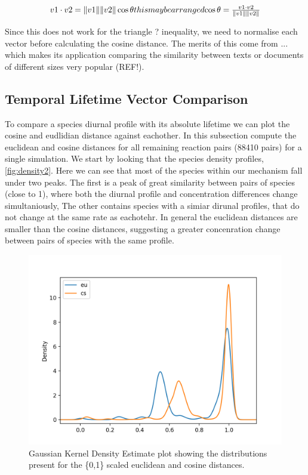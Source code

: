 \begin{equation}
v1 \cdot v2 = \|v1\|\|v2\| \cos \theta
$$this may be arranged$$
\cos \theta = \frac{ v1 \cdot v2}{\|v1\|\|v2\|}
\end{equation}

Since this does not work for the triangle ? inequality, we need to normalise each vector before calculating the cosine distance. The merits of this come from  ... which makes its application comparing the similarity between texts or documents of different sizes very popular (REF!). \\



\subsection{Temporal Lifetime Vector Comparison}

To compare a species diurnal profile with its absolute lifetime we can plot the cosine and eudlidian distance against eachother. In this subsection compute the euclidean and cosine distances for all remaining reaction pairs (88410 pairs) for a single simulation. We start by looking that the species density profiles, \autoref{fig:density2}. Here we can see that most of the species within our mechanism fall under two peaks. The first is a peak of great similarity between pairs of species (close to 1), where both the diurnal profile and concentration differences change simultaniously, The other contains species with a simiar dirunal profiles, that do not change at the same rate as eachotehr. In general the euclidean distances are smaller than the cosine distances, suggesting a greater concenration change between pairs of species with the same profile. 



\begin{figure}
    \centering
\includegraphics[width=.7\textwidth]{fig/metric_density.png}
\caption{Gaussian Kernel Density Estimate plot showing the distributions present for the \{0,1\} scaled euclidean and cosine distances.}
\label{fig:density2}
\end{figure}



